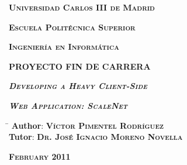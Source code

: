 \begin{titlepage}

  \addtolength{\oddsidemargin}{0.8cm}

  \centerline{\large{\textbf{\textsc{Universidad Carlos III de Madrid}}}}
  \vspace{0.8cm}

  \centerline{\large{\textbf{\textsc{Escuela Politécnica Superior}}}}
  \vspace{0.8cm}

  \centerline{\large{\textbf{\textsc{Ingeniería en Informática}}}}

  \begin{figure}[h]
  \end{figure}

  \centerline{\Large{\textbf{\uppercase{PROYECTO FIN DE CARRERA}}}}
  \vspace{2cm}

  \centerline{\huge{\textbf{\textit{\textsc{Developing a Heavy
  Client-Side}}}}}
  \vspace{0.4cm}

  \centerline{\huge{\textbf{\textit{\textsc{Web Application: ScaleNet}}}}}
  \vspace{3.5cm}

  \begin{flushright}
      \begin{tabbing}\hspace{2.5cm} \= \kill
        {\large{\textbf{Author}:}} \> {\large{\textbf{\textsc{Víctor Pimentel
        Rodríguez}}}}\\
        {\large{\textbf{Tutor}:}} \> {\large{\textbf{\textsc{Dr. José Ignacio
        Moreno Novella}}}}\\
      \end{tabbing}
  \end{flushright}

  \begin{flushright}
    {\large{\textbf{\textsc{February 2011}}}}
  \end{flushright}

\end{titlepage}